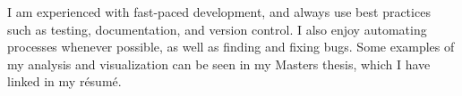I am experienced with fast-paced development, and always use best practices such as testing, documentation, and version control.
I also enjoy automating processes whenever possible, as well as finding and fixing bugs.
Some examples of my analysis and visualization can be seen in my Masters thesis, which I have linked in my r\'{e}sum\'{e}.

